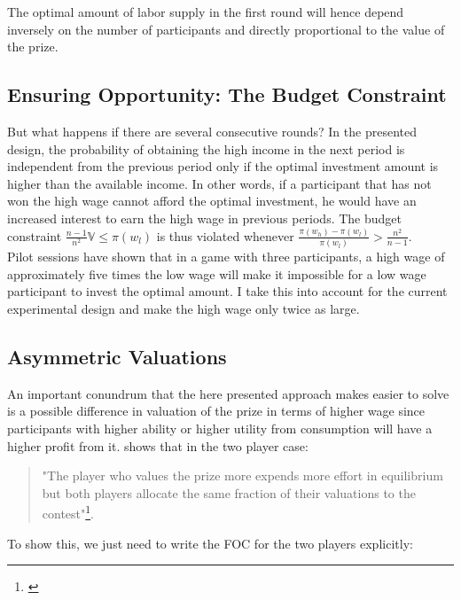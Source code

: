 The optimal amount of labor supply in the first round will hence depend inversely on the number of participants and directly proportional to the value of the prize.\\

\subsection{Ensuring Opportunity: The Budget Constraint}
\label{sec:budget_constraint}

But what happens if there are several consecutive rounds? In the presented design, the probability of obtaining the high income in the next period is independent from the previous period only if the optimal investment amount is higher than the available income. In other words, if a participant that has not won the high wage cannot afford the optimal investment, he would have an increased interest to earn the high wage in previous periods. The budget constraint $\frac{n-1}{n^2}\mathbb{V} \leq \pi(w_l)$ is thus violated whenever $\frac{\pi(w_h)-\pi(w_l)}{\pi(w_l)} > \frac{n^2}{n-1}$.\\

Pilot sessions have shown that in a game with three participants, a high wage of approximately five times the low wage will make it impossible for a low wage participant to invest the optimal amount. I take this into account for the current experimental design and make the high wage only twice as large.

\subsection{Asymmetric Valuations}

An important conundrum that the here presented approach makes easier to solve is a possible difference in valuation of the prize in terms of higher wage since participants with higher ability or higher utility from consumption will have a higher profit from it. \cite{nti1999} shows that in the two player case:\\

\begin{quote}
    "The player who values the prize more expends more effort in equilibrium but both players allocate the same fraction of their valuations to the contest"\footnote{\cite[p.~419]{nti1999}}.
\end{quote}

To show this, we just need to write the FOC for the two players explicitly:

